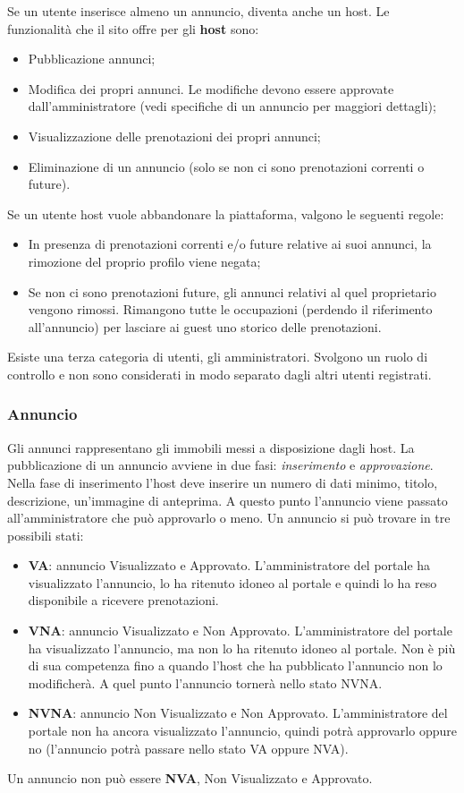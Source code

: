 \documentclass[1_relazione.tex]{subfiles}
\begin{document}
Se un utente inserisce almeno un annuncio, diventa anche un host. Le funzionalit\`{a} che il sito offre per gli \textbf{host} sono:
\begin{itemize}
\item Pubblicazione annunci;
\item Modifica dei propri annunci. Le modifiche devono essere approvate dall'amministratore (vedi specifiche di un annuncio per maggiori dettagli);
\item Visualizzazione delle prenotazioni dei propri annunci;
\item Eliminazione di un annuncio (solo se non ci sono prenotazioni correnti o future).
\end{itemize}
Se un utente host vuole abbandonare la piattaforma, valgono le seguenti regole:
\begin{itemize}
\item In presenza di prenotazioni correnti e/o future relative ai suoi annunci, la rimozione del proprio profilo viene negata;
\item Se non ci sono prenotazioni future, gli annunci relativi al quel proprietario vengono rimossi. Rimangono tutte le occupazioni (perdendo il riferimento all'annuncio) per lasciare ai guest uno storico delle prenotazioni.
\end{itemize}
Esiste una terza categoria di utenti, gli amministratori. Svolgono un ruolo di controllo e non sono considerati in modo separato dagli altri utenti registrati.  \\
\subsubsection{Annuncio} 
Gli annunci rappresentano gli immobili messi a disposizione dagli host. La pubblicazione di un annuncio avviene in due fasi: \textit{inserimento} e \textit{approvazione}.
Nella fase di inserimento l'host deve inserire un numero di dati minimo, titolo, descrizione, un'immagine di anteprima. A questo punto l'annuncio viene passato all'amministratore che pu\`{o} approvarlo o meno. Un annuncio si pu\`{o} trovare in tre possibili stati:

\begin{itemize}
\item \textbf{VA}: annuncio Visualizzato e Approvato. L'amministratore del portale ha visualizzato l'annuncio, lo ha ritenuto idoneo al portale e quindi lo ha reso disponibile a ricevere prenotazioni.
\item \textbf{VNA}: annuncio Visualizzato e Non Approvato. L'amministratore del portale ha visualizzato l'annuncio, ma non lo ha ritenuto idoneo al portale. Non \`{e} pi\`{u} di sua competenza fino a quando l'host che ha pubblicato l'annuncio non lo modificher\`{a}. A quel punto l'annuncio torner\`{a} nello stato NVNA.
\item \textbf{NVNA}: annuncio Non Visualizzato e Non Approvato. L'amministratore del portale non ha ancora visualizzato l'annuncio, quindi potr\`{a} approvarlo oppure no (l'annuncio potr\`{a} passare nello stato VA oppure NVA).
\end{itemize}
Un annuncio non pu\`{o} essere \textbf{NVA},  Non Visualizzato e Approvato.
\end{document}
